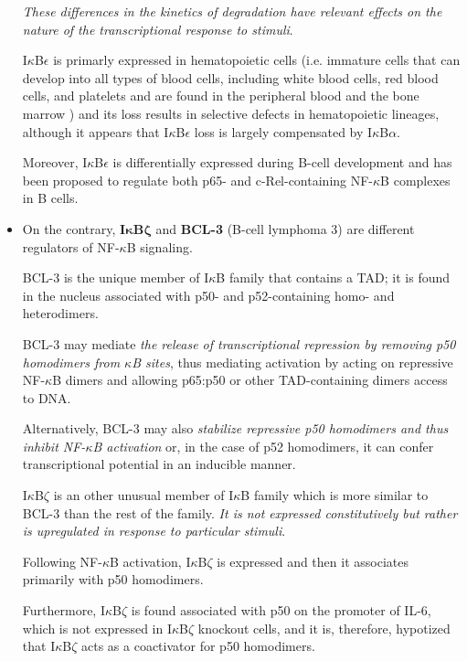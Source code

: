 \documentclass[12pt,a4paper]{report}
\begin{document}
\begin{itemize}
 \emph{These differences in the kinetics of degradation have relevant effects on the
 nature of the transcriptional response to stimuli}.
 
 I$\kappa$B$\epsilon$ is primarly expressed in hematopoietic cells (i.e. immature cells that can develop into all types of blood cells, including white blood cells, red blood cells, and platelets and are found in the peripheral blood and the bone marrow \cite{hematopoieticNIH}) and its loss results in selective defects in hematopoietic lineages, although it appears that I$\kappa$B$\epsilon$ loss is largely compensated by I$\kappa$B$\alpha$.
 
 Moreover, I$\kappa$B$\epsilon$ is differentially expressed during B-cell development and has been proposed to regulate both p65- and c-Rel-containing NF-$\kappa$B complexes in B cells.
 
 \item On the contrary, \textbf{I$\bm{\kappa}$B$\bm{\zeta}$} and \textbf{BCL-3} (B-cell lymphoma 3) are different regulators of NF-$\kappa$B signaling.
 
 BCL-3 is the unique member of I$\kappa$B family that contains a TAD; it is found in the nucleus associated with p50- and p52-containing homo- and heterodimers.
 
 BCL-3 may mediate \emph{the release of transcriptional repression by removing p50 homodimers from $\kappa$B sites}, thus mediating activation by acting on repressive NF-$\kappa$B dimers and allowing p65:p50 or other TAD-containing dimers access to DNA.
 
 Alternatively, BCL-3 may also \emph{stabilize
 repressive p50 homodimers and thus inhibit NF-$\kappa$B activation} or, in the case of p52 homodimers, it can confer transcriptional potential in an inducible manner. 
 
 I$\kappa$B$\zeta$ is an other unusual member of I$\kappa$B family which is more similar to BCL-3 than the rest of the family. \emph{It is not expressed constitutively but rather is upregulated in response to particular stimuli}.
 
 Following NF-$\kappa$B activation, I$\kappa$B$\zeta$ is expressed and then it associates primarily with p50 homodimers.
 
 Furthermore, I$\kappa$B$\zeta$ is found associated with p50 on the promoter of IL-6, which is not expressed in I$\kappa$B$\zeta$ knockout cells, and it is, therefore, hypotized that I$\kappa$B$\zeta$ acts as a coactivator for p50 homodimers. 
 

\end{itemize}
\end{document}
